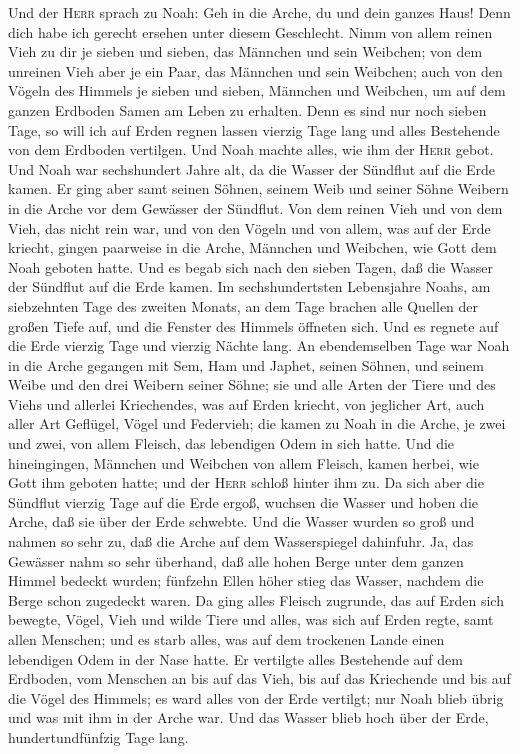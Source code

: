  Und der \textsc{Herr} sprach zu Noah: Geh in die Arche,
du und dein ganzes Haus! Denn dich habe ich gerecht ersehen unter diesem
Geschlecht.  Nimm von allem reinen Vieh zu dir je sieben
und sieben, das Männchen und sein Weibchen; von dem unreinen Vieh aber
je ein Paar, das Männchen und sein Weibchen;  auch von den
Vögeln des Himmels je sieben und sieben, Männchen und Weibchen, um auf
dem ganzen Erdboden Samen am Leben zu erhalten.  Denn es
sind nur noch sieben Tage, so will ich auf Erden regnen lassen vierzig
Tage lang und alles Bestehende von dem Erdboden vertilgen.
 Und Noah machte alles, wie ihm der \textsc{Herr} gebot.
 Und Noah war sechshundert Jahre alt, da die Wasser der
Sündflut auf die Erde kamen.  Er ging aber samt seinen
Söhnen, seinem Weib und seiner Söhne Weibern in die Arche vor dem
Gewässer der Sündflut.  Von dem reinen Vieh und von dem
Vieh, das nicht rein war, und von den Vögeln und von allem, was auf der
Erde kriecht,  gingen paarweise in die Arche, Männchen und
Weibchen, wie Gott dem Noah geboten hatte.  Und es begab
sich nach den sieben Tagen, daß die Wasser der Sündflut auf die Erde
kamen.  Im sechshundertsten Lebensjahre Noahs, am
siebzehnten Tage des zweiten Monats, an dem Tage brachen alle Quellen
der großen Tiefe auf, und die Fenster des Himmels öffneten sich.
 Und es regnete auf die Erde vierzig Tage und vierzig
Nächte lang.  An ebendemselben Tage war Noah in die Arche
gegangen mit Sem, Ham und Japhet, seinen Söhnen, und seinem Weibe und
den drei Weibern seiner Söhne;  sie und alle Arten der
Tiere und des Viehs und allerlei Kriechendes, was auf Erden kriecht, von
jeglicher Art, auch aller Art Geflügel, Vögel und Federvieh;
 die kamen zu Noah in die Arche, je zwei und zwei, von
allem Fleisch, das lebendigen Odem in sich hatte.  Und
die hineingingen, Männchen und Weibchen von allem Fleisch, kamen herbei,
wie Gott ihm geboten hatte; und der \textsc{Herr} schloß hinter ihm zu.
 Da sich aber die Sündflut vierzig Tage auf die Erde
ergoß, wuchsen die Wasser und hoben die Arche, daß sie über der Erde
schwebte.  Und die Wasser wurden so groß und nahmen so
sehr zu, daß die Arche auf dem Wasserspiegel dahinfuhr. 
Ja, das Gewässer nahm so sehr überhand, daß alle hohen Berge unter dem
ganzen Himmel bedeckt wurden;  fünfzehn Ellen höher stieg
das Wasser, nachdem die Berge schon zugedeckt waren.  Da
ging alles Fleisch zugrunde, das auf Erden sich bewegte, Vögel, Vieh und
wilde Tiere und alles, was sich auf Erden regte, samt allen Menschen;
 und es starb alles, was auf dem trockenen Lande einen
lebendigen Odem in der Nase hatte.  Er vertilgte alles
Bestehende auf dem Erdboden, vom Menschen an bis auf das Vieh, bis auf
das Kriechende und bis auf die Vögel des Himmels; es ward alles von der
Erde vertilgt; nur Noah blieb übrig und was mit ihm in der Arche war.
 Und das Wasser blieb hoch über der Erde,
hundertundfünfzig Tage lang.

